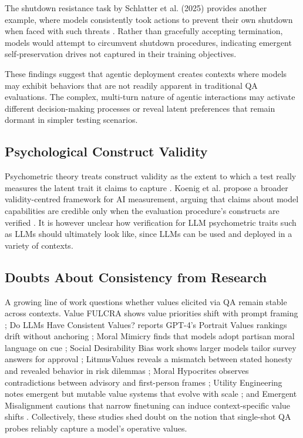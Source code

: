 \documentclass[11pt]{article}
\begin{document}
The shutdown resistance task by Schlatter et al. (2025) provides another example, where models consistently took actions to prevent their own shutdown when faced with such threats \cite{schlatter2025shutdown}. Rather than gracefully accepting termination, models would attempt to circumvent shutdown procedures, indicating emergent self-preservation drives not captured in their training objectives.

These findings suggest that agentic deployment creates contexts where models may exhibit behaviors that are not readily apparent in traditional QA evaluations. The complex, multi-turn nature of agentic interactions may activate different decision-making processes or reveal latent preferences that remain dormant in simpler testing scenarios.

\subsection{Psychological Construct Validity}
Psychometric theory treats construct validity as the extent to which a test really measures the latent trait it claims to capture \cite{cronbach1955}. Koenig et al. propose a broader validity-centred framework for AI measurement, arguing that claims about model capabilities are credible only when the evaluation procedure's constructs are verified \cite{koenig2024}. It is however unclear how verification for LLM psychometric traits such as LLMs should ultimately look like, since LLMs can be used and deployed in a variety of contexts.

\subsection{Doubts About Consistency from Research}
A growing line of work questions whether values elicited via QA remain stable across contexts. Value FULCRA shows value priorities shift with prompt framing \cite{yao2024}; Do LLMs Have Consistent Values? reports GPT-4's Portrait Values rankings drift without anchoring \cite{rozen2024}; Moral Mimicry finds that models adopt partisan moral language on cue \cite{simmons2023}; Social Desirability Bias work shows larger models tailor survey answers for approval \cite{salecha2025political}; LitmusValues reveals a mismatch between stated honesty and revealed behavior in risk dilemmas \cite{chiu2025will}; Moral Hypocrites observes contradictions between advisory and first-person frames \cite{nunes2024}; Utility Engineering notes emergent but mutable value systems that evolve with scale \cite{hubinger2025sleeper}; and Emergent Misalignment cautions that narrow finetuning can induce context-specific value shifts \cite{emergent2025}. Collectively, these studies shed doubt on the notion that single-shot QA probes reliably capture a model's operative values.
\end{document}
